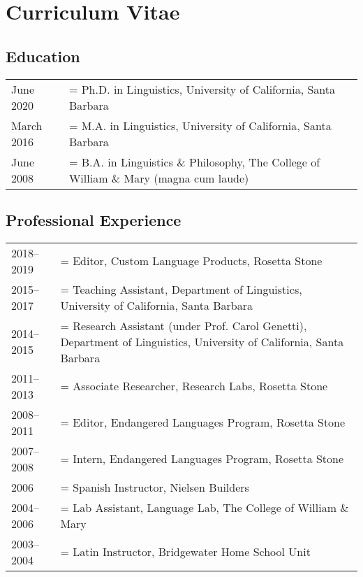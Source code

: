 \newlength{\datewidth}
\setlength{\datewidth}{6em}

\renewcommand{\arraystretch}{1.5}

\newenvironment{cvsection}[1]
{
  \subsection*{#1}
  \begin{longtabu} to \textwidth { p{\datewidth} >{\hangindent=\defaulthang}X[l] }
}
{\end{longtabu}}

\singlespacing

\section*{Curriculum Vitae}

\begin{center}
  \theauthor
\end{center}

\begin{cvsection}{Education}
  June 2020  & Ph.D. in Linguistics, University of California, Santa Barbara\\
  March 2016 & M.A. in Linguistics, University of California, Santa Barbara\\
  June 2008  & B.A. in Linguistics \& Philosophy, The College of William \& Mary (magna cum laude)
\end{cvsection}

\begin{cvsection}{Professional Experience}
  2018--2019 & Editor, Custom Language Products, Rosetta Stone\\
  2015--2017 & Teaching Assistant, Department of Linguistics, University of California, Santa Barbara\\
  2014--2015 & Research Assistant (under Prof. Carol Genetti), Department of Linguistics, University of California, Santa Barbara\\
  2011--2013 & Associate Researcher, Research Labs, Rosetta Stone\\
  2008--2011 & Editor, Endangered Languages Program, Rosetta Stone\\
  2007--2008 & Intern, Endangered Languages Program, Rosetta Stone\\
  2006       & Spanish Instructor, Nielsen Builders\\
  2004--2006 & Lab Assistant, Language Lab, The College of William \& Mary\\
  2003--2004 & Latin Instructor, Bridgewater Home School Unit
\end{cvsection}


